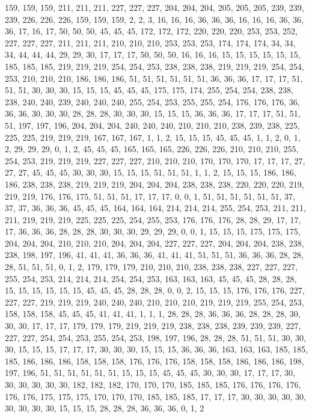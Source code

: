 159, 159, 159, 211, 211, 211, 227, 227, 227, 204, 204, 204, 205, 205, 205, 239, 239, 239, 226, 226, 226, 159, 159, 159, 2, 2, 3, 16, 16, 16, 36, 36,
36, 16, 16, 16, 36, 36, 36, 17, 16, 17, 50, 50, 50, 45, 45, 45, 172, 172, 172, 220, 220, 220, 253, 253, 252, 227, 227, 227, 211, 211, 211, 210,
210, 210, 253, 253, 253, 174, 174, 174, 34, 34, 34, 44, 44, 44, 29, 29, 30, 17, 17, 17, 50, 50, 50, 16, 16, 16, 15, 15, 15, 15, 15, 15,
185, 185, 185, 219, 219, 219, 254, 254, 253, 238, 238, 238, 219, 219, 219, 254, 254, 253, 210, 210, 210, 186, 186, 186, 51, 51, 51, 51, 51, 51, 36, 36,
36, 17, 17, 17, 51, 51, 51, 30, 30, 30, 15, 15, 15, 45, 45, 45, 175, 175, 174, 255, 254, 254, 238, 238, 238, 240, 240, 239, 240, 240, 240, 255,
254, 253, 255, 255, 254, 176, 176, 176, 36, 36, 36, 30, 30, 30, 28, 28, 28, 30, 30, 30, 15, 15, 15, 36, 36, 36, 17, 17, 17, 51, 51, 51,
197, 197, 196, 204, 204, 204, 240, 240, 240, 210, 210, 210, 238, 239, 238, 225, 225, 225, 219, 219, 219, 167, 167, 167, 1, 1, 2, 15, 15, 15, 45, 45,
45, 1, 1, 2, 0, 1, 2, 29, 29, 29, 0, 1, 2, 45, 45, 45, 165, 165, 165, 226, 226, 226, 210, 210, 210, 255, 254, 253, 219, 219, 219, 227,
227, 227, 210, 210, 210, 170, 170, 170, 17, 17, 17, 27, 27, 27, 45, 45, 45, 30, 30, 30, 15, 15, 15, 51, 51, 51, 1, 1, 2, 15, 15, 15,
186, 186, 186, 238, 238, 238, 219, 219, 219, 204, 204, 204, 238, 238, 238, 220, 220, 220, 219, 219, 219, 176, 176, 175, 51, 51, 51, 17, 17, 17, 0, 0,
1, 51, 51, 51, 51, 51, 51, 37, 37, 37, 36, 36, 36, 45, 45, 45, 164, 164, 164, 214, 214, 214, 255, 254, 253, 211, 211, 211, 219, 219, 219, 225,
225, 225, 254, 255, 253, 176, 176, 176, 28, 28, 29, 17, 17, 17, 36, 36, 36, 28, 28, 28, 30, 30, 30, 29, 29, 29, 0, 0, 1, 15, 15, 15,
175, 175, 175, 204, 204, 204, 210, 210, 210, 204, 204, 204, 227, 227, 227, 204, 204, 204, 238, 238, 238, 198, 197, 196, 41, 41, 41, 36, 36, 36, 41, 41,
41, 51, 51, 51, 36, 36, 36, 28, 28, 28, 51, 51, 51, 0, 1, 2, 179, 179, 179, 210, 210, 210, 238, 238, 238, 227, 227, 227, 255, 254, 253, 214,
214, 214, 254, 254, 253, 163, 163, 163, 45, 45, 45, 28, 28, 28, 15, 15, 15, 15, 15, 15, 45, 45, 45, 28, 28, 28, 0, 0, 2, 15, 15, 15,
176, 176, 176, 227, 227, 227, 219, 219, 219, 240, 240, 240, 210, 210, 210, 219, 219, 219, 255, 254, 253, 158, 158, 158, 45, 45, 45, 41, 41, 41, 1, 1,
1, 28, 28, 28, 36, 36, 36, 28, 28, 28, 30, 30, 30, 17, 17, 17, 179, 179, 179, 219, 219, 219, 238, 238, 238, 239, 239, 239, 227, 227, 227, 254,
254, 253, 255, 254, 253, 198, 197, 196, 28, 28, 28, 51, 51, 51, 30, 30, 30, 15, 15, 15, 17, 17, 17, 30, 30, 30, 15, 15, 15, 36, 36, 36,
163, 163, 163, 185, 185, 185, 186, 186, 186, 158, 158, 158, 176, 176, 176, 158, 158, 158, 186, 186, 186, 198, 197, 196, 51, 51, 51, 51, 51, 51, 15, 15,
15, 45, 45, 45, 30, 30, 30, 17, 17, 17, 30, 30, 30, 30, 30, 30, 182, 182, 182, 170, 170, 170, 185, 185, 185, 176, 176, 176, 176, 176, 176, 175,
175, 175, 170, 170, 170, 185, 185, 185, 17, 17, 17, 30, 30, 30, 30, 30, 30, 30, 30, 30, 15, 15, 15, 28, 28, 28, 36, 36, 36, 0, 1, 2
